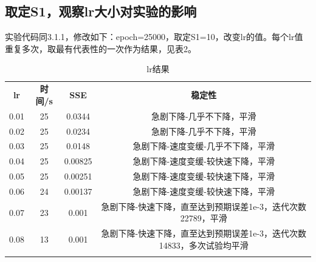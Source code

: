 \documentclass[UTF8]{article}
\begin{document}
\subsection{取定S1，观察lr大小对实验的影响}
实验代码同3.1.1，修改如下：epoch=25000，取定S1=10，改变lr的值。每个lr值重复多次，取最有代表性的一次作为结果，见表2。\\
\begin{table}[] \caption[0.3\textwidth]{lr结果} \centering
    \begin{tabular}{cccc}
    \rowcolor[HTML]{FFFFFF} 
    {\color[HTML]{333333} \textbf{lr}} & {\color[HTML]{333333} \textbf{时间/s}} & {\color[HTML]{333333} \textbf{SSE}} & {\color[HTML]{333333} \textbf{稳定性}} \\
    \rowcolor[HTML]{FFFFFF} 
    {\color[HTML]{333333} 0.01} & {\color[HTML]{333333} 25} & {\color[HTML]{333333} 0.0344} & {\color[HTML]{333333} 急剧下降-几乎不下降，平滑} \\
    \rowcolor[HTML]{F8F8F8} 
    {\color[HTML]{333333} 0.02} & {\color[HTML]{333333} 25} & {\color[HTML]{333333} 0.0234} & {\color[HTML]{333333} 急剧下降-几乎不下降，平滑} \\
    \rowcolor[HTML]{FFFFFF} 
    {\color[HTML]{333333} 0.03} & {\color[HTML]{333333} 25} & {\color[HTML]{333333} 0.0148} & {\color[HTML]{333333} 急剧下降-速度变缓-几乎不下降，平滑} \\
    \rowcolor[HTML]{F8F8F8} 
    {\color[HTML]{333333} 0.04} & {\color[HTML]{333333} 25} & {\color[HTML]{333333} 0.00825} & {\color[HTML]{333333} 急剧下降-速度变缓-较快速下降，平滑} \\
    \rowcolor[HTML]{FFFFFF} 
    {\color[HTML]{333333} 0.05} & {\color[HTML]{333333} 25} & {\color[HTML]{333333} 0.00251} & {\color[HTML]{333333} 急剧下降-速度变缓-较快速下降，平滑} \\
    \rowcolor[HTML]{F8F8F8} 
    {\color[HTML]{333333} 0.06} & {\color[HTML]{333333} 24} & {\color[HTML]{333333} 0.00137} & {\color[HTML]{333333} 急剧下降-速度变缓-较快速下降，平滑} \\
    \rowcolor[HTML]{FFFFFF} 
    {\color[HTML]{333333} 0.07} & {\color[HTML]{333333} 23} & {\color[HTML]{333333} 0.001} & {\color[HTML]{333333} 急剧下降-快速下降，直至达到预期误差1e-3，迭代次数22789，平滑} \\
    \rowcolor[HTML]{F8F8F8} 
    {\color[HTML]{333333} 0.08} & {\color[HTML]{333333} 13} & {\color[HTML]{333333} 0.001} & {\color[HTML]{333333} 急剧下降-快速下降，直至达到预期误差1e-3，迭代次数14833，多次试验均平滑} \\
    \rowcolor[HTML]{FFFFFF} 

\end{tabular}
\end{table}
\end{document}
